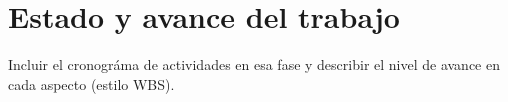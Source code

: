 \chapter{Estado y avance del trabajo}
\ifpdf
    \graphicspath{{Chapter2/Chapter2Figs/PNG/}{Chapter2/Chapter2Figs/PDF/}{Chapter2/Chapter2Figs/}}
\else
    \graphicspath{{Chapter2/Chapter2Figs/EPS/}{Chapter2/Chapter2Figs/}}
\fi


Incluir el cronográma de actividades en esa fase y describir el nivel de avance en cada aspecto (estilo WBS).



